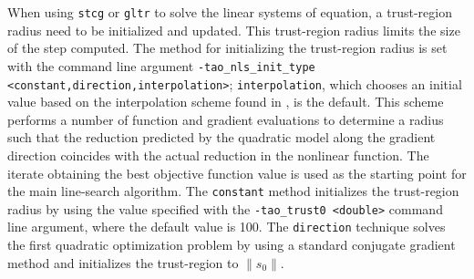 When using {\tt stcg} or {\tt gltr} to solve the linear systems of equation,
a trust-region radius need to be initialized and updated.  This trust-region
radius limits the size of the step computed.  The method for initializing
the trust-region radius is set with the command line argument 
{\tt -tao\_nls\_init\_type <constant,direction,interpolation>};
{\tt interpolation}, which chooses an initial value based on the 
interpolation scheme found in \cite{CGT}, is the default.  This
scheme performs a number of function and gradient evaluations to determine 
a radius such that the reduction predicted by the quadratic model along the 
gradient direction coincides with the actual reduction in the nonlinear 
function.  The iterate obtaining the best objective function value is 
used as the starting point for the main line-search algorithm.  The 
{\tt constant} method initializes the trust-region radius by using 
the value specified with the {\tt -tao\_trust0 <double>} command line 
argument, where the default value is 100.  The {\tt direction} technique 
solves the first quadratic optimization problem by using a standard 
conjugate gradient method and initializes the trust-region to 
$\|s_0\|$.

